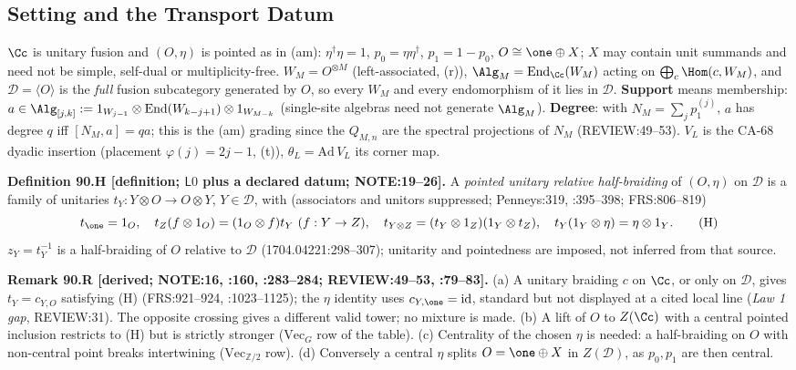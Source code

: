\subsection{Setting and the Transport Datum}

\(\Cc\) is unitary fusion and \((O,\eta)\) is pointed as in (am): \(\eta^\dagger\eta=1\), \(p_0=\eta\eta^\dagger\),
\(p_1=1-p_0\), \(O\cong\one\oplus X\); \(X\) may contain unit summands and need not be simple, self-dual or
multiplicity-free.  \(W_M=O^{\otimes M}\) (left-associated, (r)), \(\Alg_M=\operatorname{End}_\Cc(W_M)\) acting on
\(\bigoplus_c\Hom(c,W_M)\), and \(\mathcal D=\langle O\rangle\) is the \emph{full} fusion subcategory generated by \(O\), so
every \(W_M\) and every endomorphism of it lies in \(\mathcal D\).  \textbf{Support} means membership:
\(a\in\Alg_{[j,k]}:=1_{W_{j-1}}\otimes\operatorname{End}(W_{k-j+1})\otimes1_{W_{M-k}}\) (single-site algebras need not
generate \(\Alg_M\)).  \textbf{Degree}: with \(N_M=\sum_jp_1^{(j)}\), \(a\) has degree \(q\) iff \([N_M,a]=qa\); this is the
(am) grading since the \(Q_{M,n}\) are the spectral projections of \(N_M\) (REVIEW:49--53).  \(V_L\) is the CA-68 dyadic
insertion (placement \(\varphi(j)=2j-1\), (t)), \(\theta_L=\mathrm{Ad}\,V_L\) its corner map.

\textbf{Definition 90.H [definition; \(\mathsf L0\) plus a declared datum; NOTE:19--26].}  A \emph{pointed unitary
relative half-braiding} of \((O,\eta)\) on \(\mathcal D\) is a family of unitaries \(t_Y:Y\otimes O\to O\otimes Y\),
\(Y\in\mathcal D\), with (associators and unitors suppressed; Penneys:319, :395--398; FRS:806--819)
\[
 t_\one=1_O,\quad t_Z(f\otimes1_O)=(1_O\otimes f)t_Y\ (f:Y\to Z),\quad t_{Y\otimes Z}=(t_Y\otimes1_Z)(1_Y\otimes t_Z),\quad
 t_Y(1_Y\otimes\eta)=\eta\otimes1_Y. \tag{H}
\]
\(z_Y=t_Y^{-1}\) is a half-braiding of \(O\) relative to \(\mathcal D\) (1704.04221:298--307); unitarity and pointedness are
imposed, not inferred from that source.

\textbf{Remark 90.R [derived; NOTE:16, :160, :283--284; REVIEW:49--53, :79--83].}  (a) A unitary braiding \(c\) on
\(\Cc\), or only on \(\mathcal D\), gives \(t_Y=c_{Y,O}\) satisfying (H) (FRS:921--924, :1023--1125); the \(\eta\) identity
uses \(c_{Y,\one}=\mathrm{id}\), standard but not displayed at a cited local line (\emph{Law 1 gap}, REVIEW:31).  The
opposite crossing gives a different valid tower; no mixture is made.  (b) A lift of \(O\) to \(Z(\Cc)\) with a central
pointed inclusion restricts to (H) but is strictly stronger (\(\mathrm{Vec}_G\) row of the table).  (c) Centrality of the
chosen \(\eta\) is needed: a half-braiding on \(O\) with non-central point breaks intertwining (\(\mathrm{Vec}_{\mathbb Z/2}\)
row).  (d) Conversely a central \(\eta\) splits \(O=\one\oplus X\) in \(Z(\mathcal D)\), as \(p_0,p_1\) are then central.

